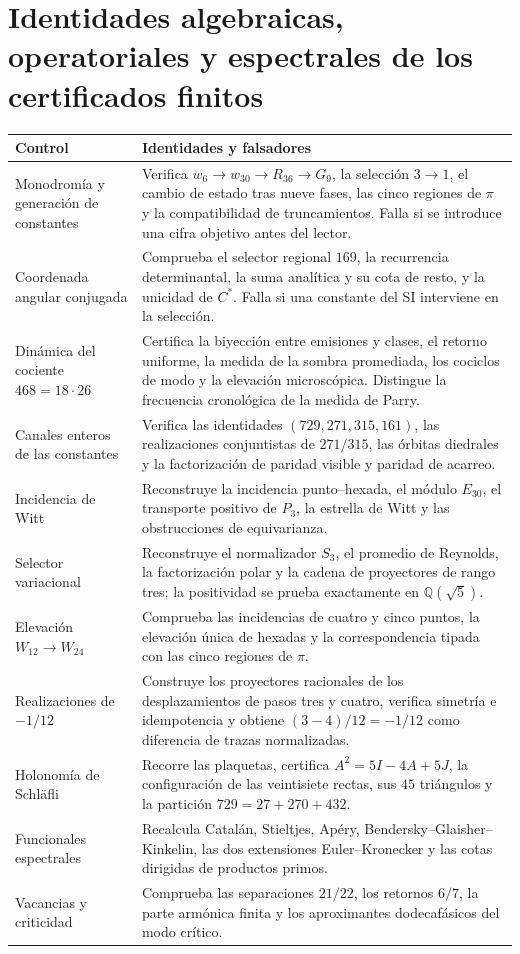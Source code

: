 \section{Identidades algebraicas, operatoriales y espectrales de los certificados finitos}

\begin{longtable}{@{}>{\raggedright\arraybackslash}p{}
  >{\raggedright\arraybackslash}p{}@{}}
\toprule
Control & Identidades y falsadores\\
\midrule
\endhead
Monodromía y generación de constantes
& Verifica \(w_6\to w_{30}\to R_{36}\to G_9\), la selección \(3\to1\),
el cambio de estado tras nueve fases, las cinco regiones de \(\pi\) y la
compatibilidad de truncamientos. Falla si se introduce una cifra objetivo
antes del lector.\\
Coordenada angular conjugada
& Comprueba el selector regional \(169\), la recurrencia determinantal, la
suma analítica y su cota de resto, y la unicidad de \(C^*\). Falla si una
constante del SI interviene en la selección.\\
Dinámica del cociente \(468=18\cdot26\)
& Certifica la biyección entre emisiones y clases, el retorno uniforme, la
medida de la sombra promediada, los cociclos de modo y la elevación
microscópica. Distingue la frecuencia cronológica de la medida de Parry.\\
Canales enteros de las constantes
& Verifica las identidades \((729,271,315,161)\), las realizaciones
conjuntistas de \(271/315\), las órbitas diedrales y la factorización de
paridad visible y paridad de acarreo.\\
Incidencia de Witt
& Reconstruye la incidencia punto--hexada, el módulo \(E_{30}\), el
transporte positivo de \(P_3\), la estrella de Witt y las obstrucciones de
equivarianza.\\
Selector variacional
& Reconstruye el normalizador \(S_3\), el promedio de Reynolds, la
factorización polar y la cadena de proyectores de rango tres; la positividad
se prueba exactamente en \(\mathbb Q(\sqrt5)\).\\
Elevación \(W_{12}\to W_{24}\)
& Comprueba las incidencias de cuatro y cinco puntos, la elevación única de
hexadas y la correspondencia tipada con las cinco regiones de \(\pi\).\\
Realizaciones de \(-1/12\)
& Construye los proyectores racionales de los desplazamientos de pasos tres
y cuatro, verifica simetría e idempotencia y obtiene
\((3-4)/12=-1/12\) como diferencia de trazas normalizadas.\\
Holonomía de Schläfli
& Recorre las plaquetas, certifica \(A^2=5I-4A+5J\), la configuración de las
veintisiete rectas, sus \(45\) triángulos y la partición
\(729=27+270+432\).\\
Funcionales espectrales
& Recalcula Catalán, Stieltjes, Apéry, Bendersky--Glaisher--Kinkelin, las
dos extensiones Euler--Kronecker y las cotas dirigidas de productos primos.\\
Vacancias y criticidad
& Comprueba las separaciones \(21/22\), los retornos \(6/7\), la parte
armónica finita y los aproximantes dodecafásicos del modo crítico.\\
\bottomrule
\end{longtable}

